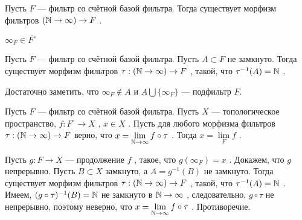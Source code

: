 \SSendp

\SSsect Пусть \( F \) --- фильтр со счётной базой фильтра. Тогда существует морфизм фильтров \( (\mathbb{N} \rightarrow \infty) \rightarrow F \) .

\SSproof

\( \infty_F \in \overline{F^{\circ}} \)

\SSendp

\SSsect Пусть \( F \) --- фильтр со счётной базой фильтра. Пусть \( A \subset F \) не замкнуто. Тогда существует морфизм фильтров \( \tau: (\mathbb{N} \rightarrow \infty) \rightarrow F \) , такой, что \( \tau^{-1}(A) = \mathbb{N} \) .

\SSproof

Достаточно заметить, что \( \infty_F \notin A \) и \( A \bigcup \{\infty_F\} \) --- подфильтр \( F \).

\SSendp

\SSsect Пусть \( F \) --- фильтр со счётной базой фильтра. Пусть \( X \) --- топологическое пространство, \( f:F^{\circ} \rightarrow X \) , \( x \in X \) . Пусть для любого морфизма фильтров \( \tau: (\mathbb{N} \rightarrow \infty) \rightarrow F \) верно, что \( x =  \lim\limits_{\mathbb{N} \rightarrow \infty} f \circ \tau \) . Тогда \( x =  \lim\limits_{F} f \) .

\SSproof

Пусть \( g:F \rightarrow X \) --- продолжение \( f \) , такое, что \( g(\infty_F)=x \) . Докажем, что \( g \) непрерывно. Пусть \( B \subset X \) замкнуто, а \( A = g^{-1}(B) \) не замкнуто. Тогда существует морфизм фильтров \( \tau: (\mathbb{N} \rightarrow \infty) \rightarrow F \) , такой, что \( \tau^{-1}(A) = \mathbb{N} \) . Имеем, \( (g \circ \tau)^{-1}(B) = \mathbb{N} \) не замкнуто в \( \mathbb{N} \rightarrow \infty \) , следовательно, \( g \circ \tau \) не непрерывно, поэтому неверно, что \( x =  \lim\limits_{\mathbb{N} \rightarrow \infty} f \circ \tau \) . Противоречие.

\SSendp


